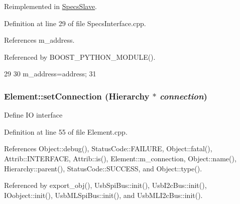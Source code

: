 Reimplemented in \hyperlink{classSpecsSlave_a1e5917c1f323cd7b4aabe4940c6baf12}{SpecsSlave}.

Definition at line 29 of file SpecsInterface.cpp.

References m\_\-address.

Referenced by BOOST\_\-PYTHON\_\-MODULE().


\begin{DoxyCode}
29                                                     {
30     m_address=address;
31 }
\end{DoxyCode}
\hypertarget{classElement_ab476b4b1df5954141ceb14f072433b89}{
\subsubsection[{setConnection}]{ Element::setConnection ({\bf Hierarchy} $\ast$ {\em connection})}}
\label{classElement_ab476b4b1df5954141ceb14f072433b89}
Define IO interface 

Definition at line 55 of file Element.cpp.

References Object::debug(), StatusCode::FAILURE, Object::fatal(), Attrib::INTERFACE, Attrib::is(), Element::m\_\-connection, Object::name(), Hierarchy::parent(), StatusCode::SUCCESS, and Object::type().

Referenced by export\_\-obj(), UsbSpiBus::init(), UsbI2cBus::init(), IOobject::init(), UsbMLSpiBus::init(), and UsbMLI2cBus::init().


